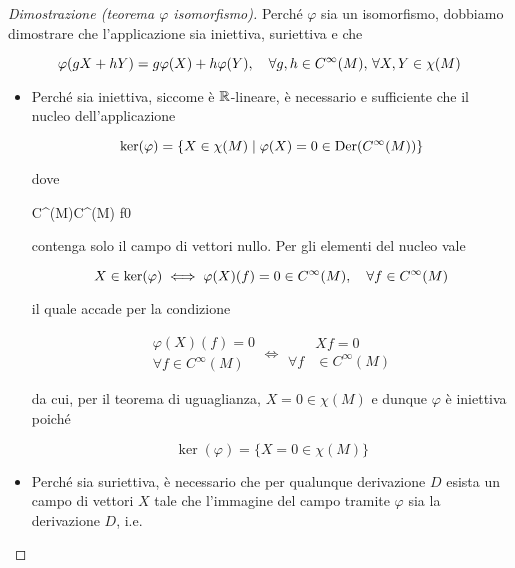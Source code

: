 \begin{proof}[Dimostrazione (teorema $ \varphi $ isomorfismo)]
	Perché $ \varphi $ sia un isomorfismo, dobbiamo dimostrare che l'applicazione sia iniettiva, suriettiva e che
	
	\begin{equation}
		\varphi(g X + h Y) = g \varphi(X) + h \varphi(Y) \qcomma \forall g,h \in C^{\infty}(M), \, \forall X,Y \in \chi(M)
	\end{equation}

\begin{itemize}
	\item Perché sia iniettiva, siccome è $ \mathbb{R} $-lineare, è necessario e sufficiente che il nucleo dell'applicazione
	
	\begin{equation}
		\ker(\varphi) = \{ X \in \chi(M) \mid \varphi(X) = 0 \in \operatorname{Der}(C^{\infty}(M)) \}
	\end{equation}

	dove
	
		{C^{\infty}(M)}{C^{\infty}(M)}
		{f}{0}

	contenga solo il campo di vettori nullo. Per gli elementi del nucleo vale
	
	\begin{equation}
		X \in \ker(\varphi) \iff \varphi(X)(f) = 0 \in C^{\infty}(M) \qcomma \forall f \in C^{\infty}(M)
	\end{equation}

	il quale accade per la condizione
	
	\begin{equation}
		\begin{aligned}
			\varphi(X)(f) = 0 \\
			\forall f \in C^{\infty}(M)
		\end{aligned} %
		\iff %
		\begin{aligned}
			& X f = 0 \\
			\forall f &\in C^{\infty}(M)
		\end{aligned}
	\end{equation}

	da cui, per il teorema di uguaglianza, $ X = 0 \in \chi(M) $ e dunque $ \varphi $ è iniettiva poiché
	
	\begin{equation}
		\ker(\varphi) = \{ X = 0 \in \chi(M) \}
	\end{equation}

	
	\item Perché sia suriettiva, è necessario che per qualunque derivazione $ D $ esista un campo di vettori $ X $ tale che l'immagine del campo tramite $ \varphi $ sia la derivazione $ D $, i.e.
	

\end{itemize}
\end{proof}
